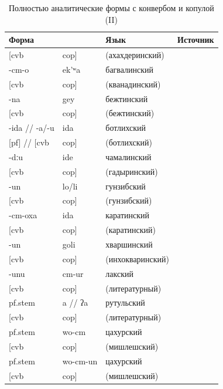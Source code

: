 \begin{table}[H]
\caption{Полностью аналитические формы с конвербом и копулой (II)}
\label{tab:pfcvbcop2}
\vspace{0.2cm}
\begin{center}
\begin{tabular}{ll|ll}
\multicolumn{2}{l|}{Форма} & Язык      & Источник            \\ \hline
{[}cvb 	&	cop{]}	&	(ахахдеринский)	&		\\
-cm-o 	&	ek'ʷa 	&	багвалинский	&	\citep{maisaktatevosov2001}	\\
{[}cvb	&	cop{]}	&	(кванадинский)	&		\\
-na 	&	gey	&	бежтинский	&	\citep{khalilova2011}	\\
{[}cvb	&	cop{]}	&	(бежтинский)	&		\\
-ida // -a/-u 	&	ida 	&	ботлихский	&	\citep{alexeyevverhees2019}	\\
{[}pf{]} // {[}cvb	&	cop{]}	&	(ботлихский)	&		\\
-dːu 	&	ide	&	чамалинский	&	\citep{bokarev1949chamalal}	\\
{[}cvb	&	cop{]}	&	(гадыринский)	&		\\
-un 	&	lo/li 	&	гунзибский	&	\citep{vandenberg1995}	\\
{[}cvb 	&	cop{]}	&	(гунзибский)	&		\\
-cm-oxa 	&	ida	&	каратинский	&	\citep{magomedbekova1971}	\\
{[}cvb 	&	cop{]}	&	(каратинский)	&		\\
-un 	&	goli 	&	хваршинский	&	\citep{khalilova2009}	\\
{[}cvb 	&	cop{]}	&	(инхокваринский)	&		\\
-unu 	&	cm-ur 	&	лакский	&	\citep{friedman2007}	\\
{[}cvb 	&	cop{]}	&	(литературный)	&		\\
pf.stem 	&	a // ʔa	&	рутульский	&	\citep{maisaklezgpf}	\\
{[}cvb 	&	cop{]}	&	(литературный)	&		\\
pf.stem 	&	wo-cm	&	цахурский	&	\citep{maisaktatevosov2007}	\\
{[}cvb 	&	cop{]}	&	(мишлешский)	&		\\
pf.stem 	&	wo-cm-un	&	цахурский	&	\citep{maisaktatevosov2007}	\\
{[}cvb 	&	cop{]}	&	(мишлешский)	&		\\
\end{tabular}
\end{center}
\end{table}

